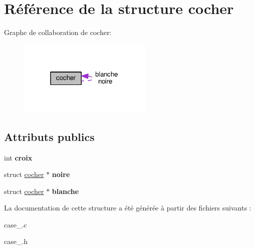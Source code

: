 \hypertarget{structcocher}{\section{Référence de la structure cocher}
\label{structcocher}
}


Graphe de collaboration de cocher\+:\nopagebreak
\begin{figure}[H]
\begin{center}
\leavevmode
\includegraphics[width=181pt]{structcocher__coll__graph}
\end{center}
\end{figure}
\subsection*{Attributs publics}
\begin{DoxyCompactItemize}
\item 
\hypertarget{structcocher_a1bc69d5a9e615b8ace629bdc3794e0ef}{int {\bfseries croix}}\label{structcocher_a1bc69d5a9e615b8ace629bdc3794e0ef}

\item 
\hypertarget{structcocher_a09aea59afcce00c90dbe2911ae437452}{struct \hyperlink{structcocher}{cocher} $\ast$ {\bfseries noire}}\label{structcocher_a09aea59afcce00c90dbe2911ae437452}

\item 
\hypertarget{structcocher_a445ec08e89d9ad03ac07ec3b07f6153f}{struct \hyperlink{structcocher}{cocher} $\ast$ {\bfseries blanche}}\label{structcocher_a445ec08e89d9ad03ac07ec3b07f6153f}

\end{DoxyCompactItemize}


La documentation de cette structure a été générée à partir des fichiers suivants \+:\begin{DoxyCompactItemize}
\item 
case\+\_\+.\+c\item 
case\+\_\+.\+h\end{DoxyCompactItemize}
